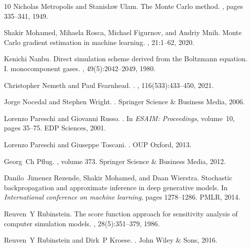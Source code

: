 \documentclass[12pt]{amsart}
\begin{document}
\begin{thebibliography}{10}
Nicholas Metropolis and Stanislaw Ulam.
\newblock The {M}onte {C}arlo method.
, pages
  335--341, 1949.

Shakir Mohamed, Mihaela Rosca, Michael Figurnov, and Andriy Mnih.
\newblock Monte {C}arlo gradient estimation in machine learning.
, 21:1--62, 2020.

Kenichi Nanbu.
\newblock Direct simulation scheme derived from the {Boltzmann} equation. {I.}
  monocomponent gases.
, 49(5):2042--2049,
  1980.

Christopher Nemeth and Paul Fearnhead.
.
,
  116(533):433--450, 2021.

Jorge Nocedal and Stephen Wright.
.
\newblock Springer Science \& Business Media, 2006.

Lorenzo Pareschi and Giovanni Russo.
.
\newblock In {\em ESAIM: Proceedings}, volume~10, pages 35--75. EDP Sciences,
  2001.

Lorenzo Pareschi and Giuseppe Toscani.
.
\newblock OUP Oxford, 2013.

Georg~Ch Pflug.
, volume 373.
\newblock Springer Science \& Business Media, 2012.

Danilo~Jimenez Rezende, Shakir Mohamed, and Daan Wierstra.
\newblock Stochastic backpropagation and approximate inference in deep
  generative models.
\newblock In {\em International conference on machine learning}, pages
  1278--1286. PMLR, 2014.

Reuven~Y Rubinstein.
\newblock The score function approach for sensitivity analysis of computer
  simulation models.
, 28(5):351--379, 1986.

Reuven~Y Rubinstein and Dirk~P Kroese.
.
\newblock John Wiley \& Sons, 2016.


\end{thebibliography}
\end{document}
